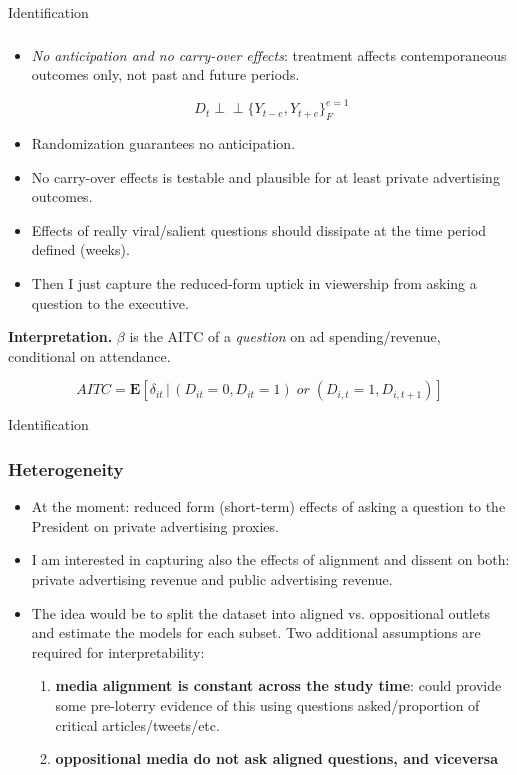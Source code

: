 \documentclass[10pt,aspectratio=169]{beamer}
\newcommand{\ind}{\perp\!\!\!\!\perp}
\begin{document}
\begin{frame}{Identification}\frametitle{}

\small
\begin{itemize}\setlength\itemsep{0.65em}

    \medskip
    \item \emph{No anticipation and no carry-over effects}: treatment affects contemporaneous outcomes only, not past and future periods. 

    $$D_{t} \ind \{Y_{t-e}, Y_{t+e}\}^{e = 1}_{F}$$
    \item Randomization guarantees no anticipation.
    \item No carry-over effects is testable and plausible for at least private advertising outcomes.
    \item Effects of really viral/salient questions should dissipate at the time period defined (weeks).
    \item Then I just capture the reduced-form \alert{uptick in viewership} from asking a question to the executive.

    
\end{itemize}

\textbf{Interpretation.} $\beta$ is the AITC %
of a \emph{question} on ad spending/revenue, conditional on attendance.

$$AITC = \mathbf{E}[\delta_{it} \, | \, (D_{it} = 0, D_{it} = 1) \; or \; (D_{i,t} = 1, D_{i, t+1})]$$

\end{frame}

\begin{frame}{Identification}\frametitle{Heterogeneity}

\small

\begin{itemize}\setlength\itemsep{0.65em}

    \medskip
    \item At the moment: reduced form (short-term) effects of \alert{asking a question} to the President on private advertising proxies.
    \item I am interested in capturing also the effects of alignment and dissent on both: private advertising revenue and public advertising revenue.
    \item The idea would be to split the dataset into aligned vs. oppositional outlets and estimate the models for each subset. Two additional assumptions are required for interpretability:
    \begin{enumerate}
        \item \textbf{media alignment is constant across the study time}: could provide some pre-loterry evidence of this using questions asked/proportion of critical articles/tweets/etc.
        \item \textbf{oppositional media do not ask aligned questions, and viceversa}
    \end{enumerate}

    
\end{itemize}

\end{frame}
\end{document}
